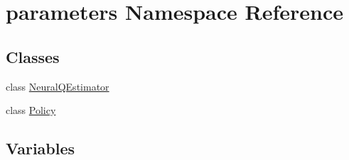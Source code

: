 \hypertarget{namespaceparameters}{}\section{parameters Namespace Reference}
\label{namespaceparameters}
\subsection*{Classes}
\begin{DoxyCompactItemize}
\item 
class \hyperlink{classparameters_1_1_neural_q_estimator}{Neural\+Q\+Estimator}
\item 
class \hyperlink{classparameters_1_1_policy}{Policy}
\end{DoxyCompactItemize}
\subsection*{Variables}

